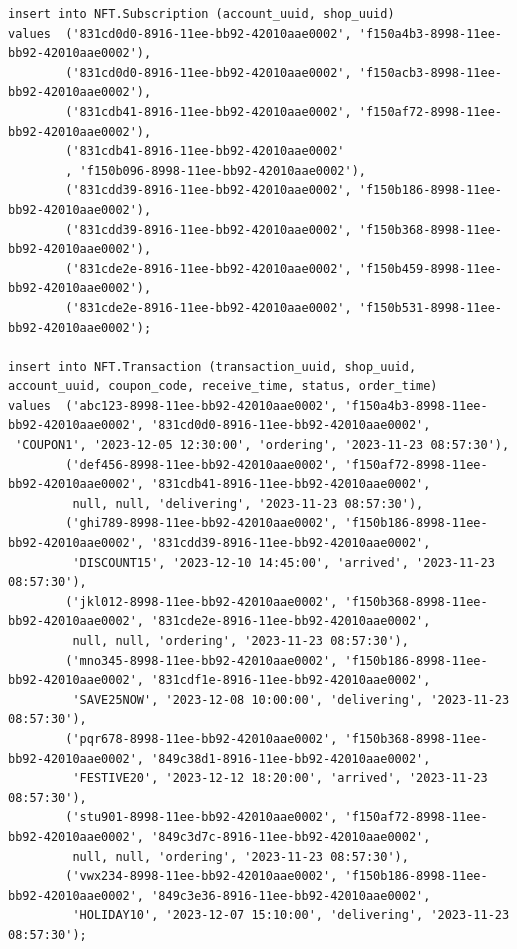 \documentclass[a4paper, 12pt]{article}
\begin{document}
\begin{verbatim}
insert into NFT.Subscription (account_uuid, shop_uuid)
values  ('831cd0d0-8916-11ee-bb92-42010aae0002', 'f150a4b3-8998-11ee-bb92-42010aae0002'),
        ('831cd0d0-8916-11ee-bb92-42010aae0002', 'f150acb3-8998-11ee-bb92-42010aae0002'),
        ('831cdb41-8916-11ee-bb92-42010aae0002', 'f150af72-8998-11ee-bb92-42010aae0002'),
        ('831cdb41-8916-11ee-bb92-42010aae0002'
        , 'f150b096-8998-11ee-bb92-42010aae0002'),
        ('831cdd39-8916-11ee-bb92-42010aae0002', 'f150b186-8998-11ee-bb92-42010aae0002'),
        ('831cdd39-8916-11ee-bb92-42010aae0002', 'f150b368-8998-11ee-bb92-42010aae0002'),
        ('831cde2e-8916-11ee-bb92-42010aae0002', 'f150b459-8998-11ee-bb92-42010aae0002'),
        ('831cde2e-8916-11ee-bb92-42010aae0002', 'f150b531-8998-11ee-bb92-42010aae0002');
        
insert into NFT.Transaction (transaction_uuid, shop_uuid, account_uuid, coupon_code, receive_time, status, order_time)
values  ('abc123-8998-11ee-bb92-42010aae0002', 'f150a4b3-8998-11ee-bb92-42010aae0002', '831cd0d0-8916-11ee-bb92-42010aae0002',
 'COUPON1', '2023-12-05 12:30:00', 'ordering', '2023-11-23 08:57:30'),
        ('def456-8998-11ee-bb92-42010aae0002', 'f150af72-8998-11ee-bb92-42010aae0002', '831cdb41-8916-11ee-bb92-42010aae0002',
         null, null, 'delivering', '2023-11-23 08:57:30'),
        ('ghi789-8998-11ee-bb92-42010aae0002', 'f150b186-8998-11ee-bb92-42010aae0002', '831cdd39-8916-11ee-bb92-42010aae0002',
         'DISCOUNT15', '2023-12-10 14:45:00', 'arrived', '2023-11-23 08:57:30'),
        ('jkl012-8998-11ee-bb92-42010aae0002', 'f150b368-8998-11ee-bb92-42010aae0002', '831cde2e-8916-11ee-bb92-42010aae0002',
         null, null, 'ordering', '2023-11-23 08:57:30'),
        ('mno345-8998-11ee-bb92-42010aae0002', 'f150b186-8998-11ee-bb92-42010aae0002', '831cdf1e-8916-11ee-bb92-42010aae0002',
         'SAVE25NOW', '2023-12-08 10:00:00', 'delivering', '2023-11-23 08:57:30'),
        ('pqr678-8998-11ee-bb92-42010aae0002', 'f150b368-8998-11ee-bb92-42010aae0002', '849c38d1-8916-11ee-bb92-42010aae0002',
         'FESTIVE20', '2023-12-12 18:20:00', 'arrived', '2023-11-23 08:57:30'),
        ('stu901-8998-11ee-bb92-42010aae0002', 'f150af72-8998-11ee-bb92-42010aae0002', '849c3d7c-8916-11ee-bb92-42010aae0002',
         null, null, 'ordering', '2023-11-23 08:57:30'),
        ('vwx234-8998-11ee-bb92-42010aae0002', 'f150b186-8998-11ee-bb92-42010aae0002', '849c3e36-8916-11ee-bb92-42010aae0002',
         'HOLIDAY10', '2023-12-07 15:10:00', 'delivering', '2023-11-23 08:57:30');
         

\end{verbatim}
\end{document}
